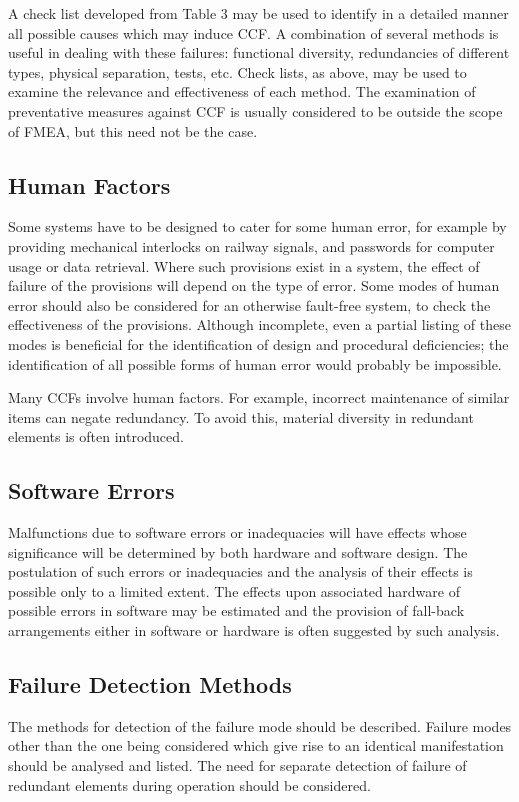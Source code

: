 \documentclass[./dissertation.tex]{subfiles}
\begin{document}
A check list developed from Table 3 may be used to identify in a detailed manner all possible causes which may induce CCF. A combination of several methods is useful in dealing with these failures: functional diversity, redundancies of different types, physical separation, tests, etc. Check lists, as above, may be used to examine the relevance and effectiveness of each method. The examination of preventative measures against CCF is usually considered to be outside the scope of FMEA, but this need not be the case.

\subsection{Human Factors}
Some systems have to be designed to cater for some human error, for example by providing mechanical interlocks on railway signals, and passwords for computer usage or data retrieval. Where such provisions exist in a system, the effect of failure of the provisions will depend on the type of error. Some modes of human error should also be considered for an otherwise fault-free system, to check the effectiveness of the provisions. Although incomplete, even a partial listing of these modes is beneficial for the identification of design and procedural deficiencies; the identification of all possible forms of human error would probably be impossible.

Many CCFs involve human factors. For example, incorrect maintenance of similar items can negate redundancy. To avoid this, material diversity in redundant elements is often introduced.

\subsection{Software Errors}
Malfunctions due to software errors or inadequacies will have effects whose significance will be determined by both hardware and software design. The postulation of such errors or inadequacies and the analysis of their effects is possible only to a limited extent. The effects upon associated hardware of possible errors in software may be estimated and the provision of fall-back arrangements either in software or hardware is often suggested by such analysis.

\subsection{Failure Detection Methods}
The methods for detection of the failure mode should be described. Failure modes other than the one being considered which give rise to an identical manifestation should be analysed and listed. The need for separate detection of failure of redundant elements during operation should be considered.
\end{document}
